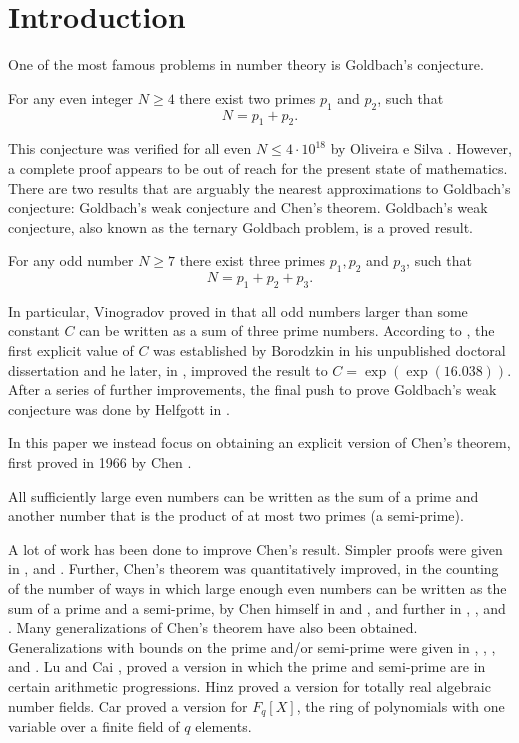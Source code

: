 \documentclass[12pt]{amsart}
\begin{document}
\section{Introduction}
One of the most famous problems in number theory is Goldbach's conjecture.
\begin{conjecture}[Goldbach]
For any even integer $N\ge 4$ there exist two primes $p_1$ and $p_2$, such that
\begin{equation*}
N=p_1+p_2.
\end{equation*}
\end{conjecture}
This conjecture was verified for all even $N\le 4\cdot 10^{18}$ by Oliveira e Silva \cite{TOS}. However, a complete proof appears to be out of reach for the present state of mathematics. There are two results that are arguably the nearest approximations to Goldbach's conjecture: Goldbach's weak conjecture and Chen's theorem. Goldbach's weak conjecture, also known as the ternary Goldbach problem, is a proved result.
\begin{theorem}
For any odd number $N \ge 7$ there exist three primes $p_1, p_2$ and $p_3$, such that
\begin{equation*}
N=p_1+p_2+p_3.
\end{equation*}
\end{theorem}
In particular, Vinogradov proved in \cite{Vinogradov} that all odd numbers larger than some constant $C$ can be written as a sum of three prime numbers. According to \cite[p. 201]{Chu}, the first explicit value of $C$ was established by Borodzkin in his unpublished doctoral dissertation and he later, in \cite{Bro}, improved the result to $C=\exp (\exp (16.038))$. After a series of further improvements, the final push to prove Goldbach's weak conjecture was done by Helfgott in \cite{Helfgott}.

In this paper we instead focus on obtaining an explicit version of Chen's theorem, first proved in 1966 by Chen \cite{Chen2, Chen1}.
\begin{theorem}[Chen]
All sufficiently large even numbers can be written as the sum of a prime and another number that is the product of at most two primes (a semi-prime).
\end{theorem}
A lot of work has been done to improve Chen's result. Simpler proofs were given in \cite{Halberstam}, \cite{Ross} and \cite{Nathanson}. Further, Chen's theorem was quantitatively improved, in the counting of the number of ways in which large enough even numbers can be written as the sum of a prime and a semi-prime, by Chen himself in \cite{Chen} and \cite{Chen3}, and further in \cite{Cai}, \cite{Wu}, \cite{Cai1} and \cite{Wu1}. Many generalizations of Chen's theorem have also been obtained. Generalizations with bounds on the prime and/or semi-prime were given in \cite{Lu1}, \cite{Cai2}, \cite{Cai3}, \cite{Li} and \cite{Cai4}. Lu and Cai \cite{Lu}, proved a version in which the prime and semi-prime are in certain arithmetic progressions. Hinz \cite{Hinz} proved a version for totally real algebraic number fields. Car \cite{Car} proved a version for $F_q[X]$, the ring of polynomials with one variable over a finite field of $q$ elements.
\end{document}
